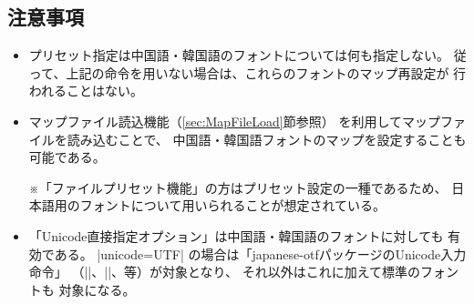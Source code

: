 \documentclass[uplatex,dvipdfmx,a4paper]{jsarticle}
\newcommand{\Pkg}[1]{\textsf{#1}}
\newcommand{\Note}{\par\noindent ※}
\begin{document}
\subsection{注意事項}

\begin{itemize}
\item プリセット指定は中国語・韓国語のフォントについては何も指定しない。
従って、上記の命令を用いない場合は、これらのフォントのマップ再設定が
行われることはない。
\item マップファイル読込機能（\ref{sec:MapFileLoad}節参照）
を利用してマップファイルを読み込むことで、
中国語・韓国語フォントのマップを設定することも可能である。
\Note 「ファイルプリセット機能」の方はプリセット設定の一種であるため、
日本語用のフォントについて用いられることが想定されている。
\item 「Unicode直接指定オプション」は中国語・韓国語のフォントに対しても
有効である。
|unicode=UTF| の場合は「\Pkg{japanese-otf}パッケージのUnicode入力命令」
（|\UTFK|、|\UTFM|、等）が対象となり、
それ以外はこれに加えて{\upTeX}標準のフォントも
対象になる。
\end{itemize}

\end{document}
